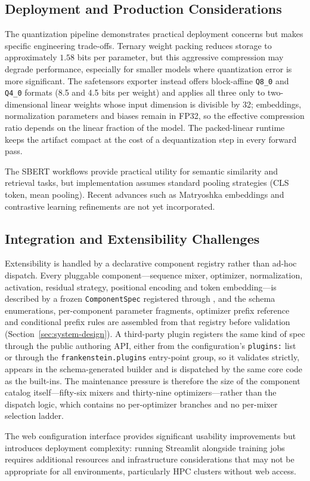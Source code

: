 \subsection{Deployment and Production Considerations}

The quantization pipeline demonstrates practical deployment concerns but makes specific engineering trade-offs. Ternary weight packing reduces storage to approximately $1.58$ bits per parameter, but this aggressive compression may degrade performance, especially for smaller models where quantization error is more significant. The safetensors exporter instead offers block-affine \texttt{Q8\_0} and \texttt{Q4\_0} formats (8.5 and 4.5 bits per weight) and applies all three only to two-dimensional linear weights whose input dimension is divisible by 32; embeddings, normalization parameters and biases remain in FP32, so the effective compression ratio depends on the linear fraction of the model. The packed-linear runtime keeps the artifact compact at the cost of a dequantization step in every forward pass.

The SBERT workflows provide practical utility for semantic similarity and retrieval tasks, but implementation assumes standard pooling strategies (CLS token, mean pooling). Recent advances such as Matryoshka embeddings \citep{muennighoff_matryoshka_2021} and contrastive learning refinements \citep{chen_supervised_2020} are not yet incorporated.

\subsection{Integration and Extensibility Challenges}

Extensibility is handled by a declarative component registry rather than ad-hoc dispatch. Every pluggable component---sequence mixer, optimizer, normalization, activation, residual strategy, positional encoding and token embedding---is described by a frozen \texttt{ComponentSpec} registered through , and the schema enumerations, per-component parameter fragments, optimizer prefix reference and conditional prefix rules are assembled from that registry before validation (Section~\ref{sec:system-design}). A third-party plugin registers the same kind of spec through the public authoring API, either from the configuration's \texttt{plugins:} list or through the \texttt{frankenstein.plugins} entry-point group, so it validates strictly, appears in the schema-generated builder and is dispatched by the same core code as the built-ins. The maintenance pressure is therefore the size of the component catalog itself---fifty-six mixers and thirty-nine optimizers---rather than the dispatch logic, which contains no per-optimizer branches and no per-mixer selection ladder.

The web configuration interface provides significant usability improvements but introduces deployment complexity: running Streamlit alongside training jobs requires additional resources and infrastructure considerations that may not be appropriate for all environments, particularly HPC clusters without web access.

